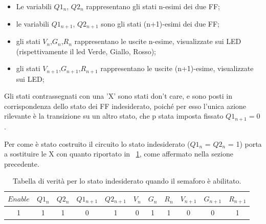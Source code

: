 \documentclass[a4paper,10pt]{article}
\begin{document}
\begin{itemize}
	\item Le variabili $Q1_n$, $Q2_n$ rappresentano gli stati n-esimi dei due FF;
	\item le variabili $Q1_{n+1}$, $Q2_{n+1}$ sono gli stati (n+1)-esimi dei due FF;
	\item gli stati $V_n$,$G_n$,$R_n$ rappresentano le uscite n-esime, visualizzate sui LED (rispettivamente il led Verde, Giallo, Rosso);
	\item gli stati $V_{n+1}$,$G_{n+1}$,$R_{n+1}$ rappresentano le uscite (n+1)-esime, visualizzate sui LED;
\end{itemize}
Gli stati contrassegnati con una 'X' sono stati don't care, e sono posti in corrispondenza dello stato dei FF indesiderato, poiché per esso l'unica azione rilevante è la transizione su un altro stato, che p stata imposta fissato $ Q1_{n+1} = 0 $.

Per come è stato costruito il circuito lo stato indesiderato ($Q1_n$ = $Q2_n$ = 1) porta a sostituire le X con quanto riportato in \tablename{~\ref{tab:inde}}, come affermato nella sezione precedente.

\begin{table}[H]
	\centering
	\begin{tabular}{c|cc|cc|ccc|ccc}
		\hline
		$Enable$ & $Q1_n$ &	$Q2_n$ & $Q1_{n+1}$ & $Q2_{n+1}$ & $V_n$ & $G_n$ & $R_n$ & $V_{n+1}$ & $G_{n+1}$ & $R_{n+1}$ \\
		\hline
		1 & 1 & 1 & 0 & 1 & 0 &  1 & 1 & 0 & 0 & 1  \\
		\hline
	\end{tabular}
	\caption{Tabella di verità per lo stato indesiderato quando il semaforo è abilitato.}
	\label{tab:inde}
\end{table}
%
\end{document}
